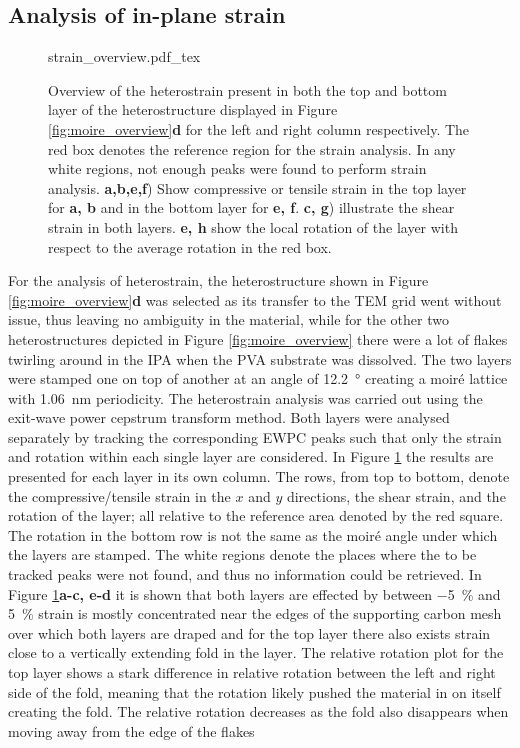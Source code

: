 \subsection{Analysis of in-plane strain}
\begin{figure}[p]
    \centering
    \def\svgwidth{.74\linewidth}
    {strain_overview.pdf_tex}
    \caption{Overview of the heterostrain present in both the top and bottom layer of the heterostructure displayed in Figure \ref{fig:moire_overview}\textbf{d} for the left and right column respectively. The red box denotes the reference region for the strain analysis. In any white regions, not enough peaks were found to perform strain analysis. \textbf{a,b,e,f}) Show compressive or tensile strain in the top layer for \textbf{a, b} and in the bottom layer for \textbf{e, f}. \textbf{c, g}) illustrate the shear strain in both layers. \textbf{e, h} show the local rotation of the layer with respect to the average rotation in the red box.}
    \label{fig:strain_overview}
\end{figure}

For the analysis of heterostrain, the heterostructure shown in Figure \ref{fig:moire_overview}\textbf{d} was selected as its transfer to the TEM grid went without issue, thus leaving no ambiguity in the material, while for the other two heterostructures depicted in Figure \ref{fig:moire_overview} there were a lot of flakes twirling around in the IPA when the PVA substrate was dissolved. The two layers were stamped one on top of another at an angle of \SI{12.2}{\degree} creating a moiré lattice with \SI{1.06}{\nano\meter} periodicity.
The heterostrain analysis was carried out using the exit-wave power cepstrum transform method. Both layers were analysed separately by tracking the corresponding EWPC peaks such that only the strain and rotation within each single layer are considered. In Figure \ref{fig:strain_overview} the results are presented for each layer in its own column. The rows, from top to bottom, denote the compressive/tensile strain in the $x$ and $y$ directions, the shear strain, and the rotation of the layer; all relative to the reference area denoted by the red square. The rotation in the bottom row is not the same as the moiré angle under which the layers are stamped. The white regions denote the places where the to be tracked peaks were not found, and thus no information could be retrieved.
In Figure \ref{fig:strain_overview}\textbf{a-c, e-d} it is shown that both layers are effected by between \SI{-5}{\percent} and \SI{5}{\percent} strain is mostly concentrated near the edges of the supporting carbon mesh over which both layers are draped and for the top layer there also exists strain close to a vertically extending fold in the layer. The relative rotation plot for the top layer shows a stark difference in relative rotation between the left and right side of the fold, meaning that the rotation likely pushed the material in on itself creating the fold. The relative rotation decreases as the fold also disappears when moving away from the edge of the flakes
\newpage

